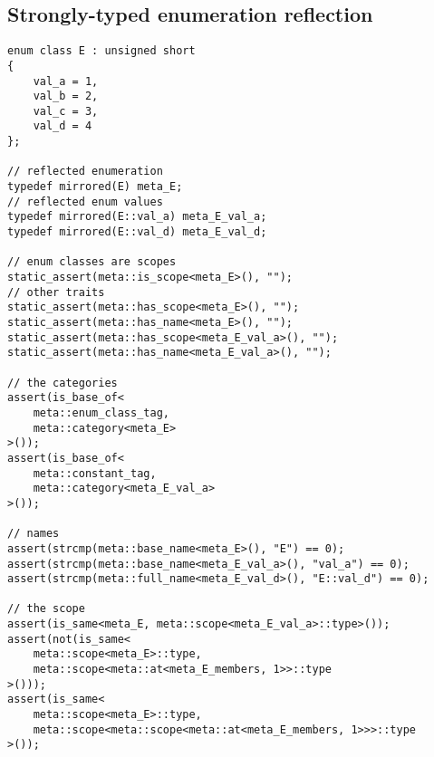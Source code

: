 \subsection{Strongly-typed enumeration reflection}

\begin{verbatim}
enum class E : unsigned short
{
	val_a = 1,
	val_b = 2,
	val_c = 3,
	val_d = 4
};

// reflected enumeration
typedef mirrored(E) meta_E;
// reflected enum values
typedef mirrored(E::val_a) meta_E_val_a;
typedef mirrored(E::val_d) meta_E_val_d;

// enum classes are scopes
static_assert(meta::is_scope<meta_E>(), "");
// other traits
static_assert(meta::has_scope<meta_E>(), "");
static_assert(meta::has_name<meta_E>(), "");
static_assert(meta::has_scope<meta_E_val_a>(), "");
static_assert(meta::has_name<meta_E_val_a>(), "");

// the categories
assert(is_base_of<
	meta::enum_class_tag,
	meta::category<meta_E>
>());
assert(is_base_of<
	meta::constant_tag,
	meta::category<meta_E_val_a>
>());

// names
assert(strcmp(meta::base_name<meta_E>(), "E") == 0);
assert(strcmp(meta::base_name<meta_E_val_a>(), "val_a") == 0);
assert(strcmp(meta::full_name<meta_E_val_d>(), "E::val_d") == 0);

// the scope
assert(is_same<meta_E, meta::scope<meta_E_val_a>::type>());
assert(not(is_same<
	meta::scope<meta_E>::type,
	meta::scope<meta::at<meta_E_members, 1>>::type
>()));
assert(is_same<
	meta::scope<meta_E>::type,
	meta::scope<meta::scope<meta::at<meta_E_members, 1>>>::type
>());

\end{verbatim}
